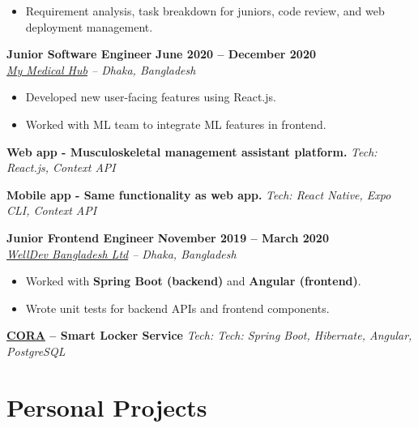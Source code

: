 \documentclass[11pt,a4paper]{article}
\newcommand{\role}[4]{
    \noindent\textbf{\large #1} \hfill \textbf{#2} \\
    \textit{#3} \hfill \textit{#4}
    \vspace{2pt}
}
\newcommand{\project}[2]{
    \noindent\textbf{#1} \hfill \textit{Tech: #2}
    \vspace{1pt}
}
\begin{document}
\begin{itemize}[leftmargin=16pt, nosep]
    \item Requirement analysis, task breakdown for juniors, code review, and web deployment management.
\end{itemize}

\vspace{4pt}

\role{Junior Software Engineer}{June 2020 -- December 2020}{\href{https://mymedicalhub.com}{My Medical Hub} -- Dhaka, Bangladesh}{}

\begin{itemize}[leftmargin=16pt, nosep]
    \item Developed new user-facing features using React.js.
    \item Worked with ML team to integrate ML features in frontend.
\end{itemize}

\vspace{4pt}

\project{Web app - Musculoskeletal management assistant platform.}{React.js, Context API}
\vspace{2pt}

\project{Mobile app - Same functionality as web app.}{React Native, Expo CLI, Context API}

\vspace{4pt}

\role{Junior Frontend Engineer}{November 2019 -- March 2020}{\href{https://www.welldev.io}{WellDev Bangladesh Ltd} -- Dhaka, Bangladesh}{}

\begin{itemize}[leftmargin=16pt, nosep]
    \item Worked with \textbf{Spring Boot (backend)} and \textbf{Angular (frontend)}.
    \item Wrote unit tests for backend APIs and frontend components.
\end{itemize}

\vspace{4pt}

\project{\href{https://www.pidas.com/cora-der-intelligente-it-automat}{CORA} -- Smart Locker Service}{Tech: Spring Boot, Hibernate, Angular, PostgreSQL}

\section{Personal Projects}
\end{document}
